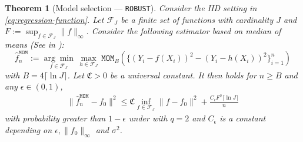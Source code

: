 \documentclass[12pt]{article}
\newtheorem{theorem}{Theorem}[section]
\begin{document}
\begin{theorem}[Model selection --- \texttt{ROBUST}]\label{thm:oracle-cv-mom}
	Consider the IID setting in \eqref{eq:regression-function}. Let $\mathcal{F}_J$ be a finite set of functions with cardinality $J$ and $F := \sup_{f \in \mathcal{F}_J}\|f\|_\infty$. Consider the following estimator based on median of means (See  in ):
	\begin{equation*}
\widehat{f}_n^{\mathtt{MOM}}:=\underset{f \in \mathcal{F}_J}{\arg \min } \, \max_{h \in \mathcal{F}_J} \, \mathtt{MOM}_B \left(\{\left(Y_i-f(X_i)\right)^2 - \left(Y_i-h(X_i)\right)^2\}_{i=1}^n\right)
\end{equation*}
with $B = 4\lceil \ln J \rceil$. Let $\mathfrak{C} > 0$ be a universal constant. It then holds for $n \ge B$ and any $\epsilon \in (0,1)$, 
	\begin{equation}
\begin{aligned}
\|\widehat{f}^{\mathtt{MOM}}_n-f_0\|^2 \leq  \mathfrak{C}\inf_{f\in\mathcal{F}_J}\|f-f_0\|^2 + \frac{C_\epsilon F^2\lceil \ln J \rceil}{n}
\end{aligned}
\end{equation}
with probability greater than $1-\epsilon$ under  with $q=2$ and $C_\epsilon$ is a constant depending on $\epsilon, \|f_0\|_\infty$ and $\sigma^2$.
\end{theorem}
\end{document}
